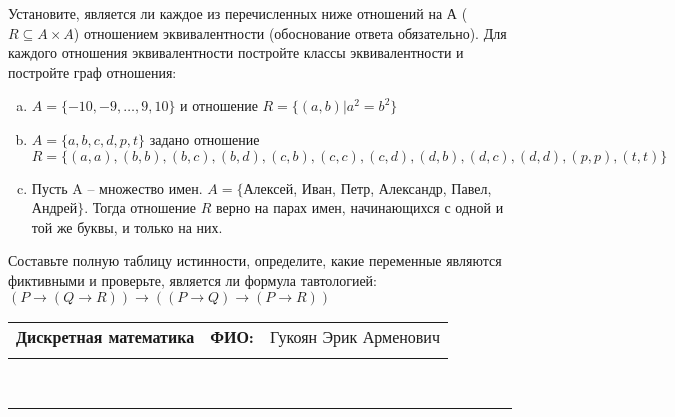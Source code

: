 \documentclass[10pt]{exam}
\newcommand{\class}{Дискретная математика}
\newcommand{\examdate}{}
\begin{document}
\begin{questions}
\question
Установите, является ли каждое из перечисленных ниже отношений на А ($R \subseteq A \times A$) отношением эквивалентности (обоснование ответа обязательно). Для каждого отношения эквивалентности постройте классы 
эквивалентности и постройте граф отношения:
\begin{enumerate} [a)]\setcounter{enumi}{0}
\item $A = \{-10, -9, … , 9, 10\}$ и отношение $R = \{(a,b)|a^{2} = b^{2}\}$
\item $A = \{a, b, c, d, p, t\}$ задано отношение $R = \{(a, a), (b, b), (b, c), (b, d), (c, b), (c, c), (c, d), (d, b), (d, c), (d, d), (p,p), (t,t)\}$
\item Пусть A – множество имен. $A = \{ $Алексей, Иван, Петр, Александр, Павел, Андрей$ \}$. Тогда отношение $R$ верно на парах имен, начинающихся с одной и той же буквы, и только на них.
\end{enumerate}\question Составьте полную таблицу истинности, определите, какие переменные являются фиктивными и проверьте, является ли формула тавтологией:
$(P \rightarrow (Q \rightarrow R)) \rightarrow ((P \rightarrow Q) \rightarrow (P \rightarrow R))$

\end{questions}
\newpage
\begin{flushright}
\begin{tabular}{p{2.8in} r l}
\textbf{\class} & \textbf{ФИО:} &Гукоян Эрик Арменович
\\

\textbf{\examdate} &&\\
\end{tabular}\\
\end{flushright}
\rule[1ex]{\textwidth}{.1pt}
\end{document}
